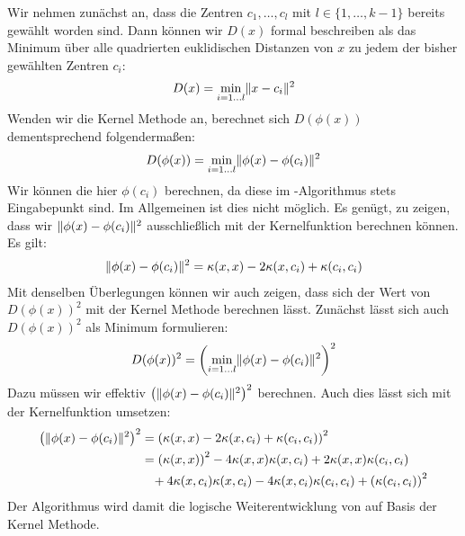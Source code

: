 Wir nehmen zunächst an, dass die Zentren $c_1, \dots, c_l$ mit $l \in \{ 1, \dots, k-1 \}$ bereits gewählt worden sind.
Dann können wir $D(x)$ formal beschreiben als das Minimum über alle quadrierten euklidischen Distanzen von $x$ zu jedem der bisher
gewählten Zentren $c_i$:
\[ D(x) = \min_{i = 1 \dots l} \lVert {x} - {c_i} \rVert^2 \]
Wenden wir die Kernel Methode an, berechnet sich $D(\phi(x))$ dementsprechend folgendermaßen:
\[ D(\phi(x)) = \min_{i = 1 \dots l} \lVert {\phi(x)} - {\phi(c_i)} \rVert^2 \]
Wir können die hier $\phi(c_i)$ berechnen, da diese im \kkmpp-Algorithmus stets Eingabepunkt sind. Im Allgemeinen ist dies
nicht möglich.
Es genügt, zu zeigen, dass wir $\lVert {\phi(x)} - {\phi(c_i)} \rVert^2$ ausschließlich mit der Kernelfunktion berechnen
können.
Es gilt:
\begin{align}
	\lVert {\phi(x)} - {\phi(c_i)} \rVert^2 = \kappa(x,x) - 2 \kappa(x,c_i) + \kappa(c_i,c_i)
\end{align}
Mit denselben Überlegungen können wir auch zeigen, dass sich der Wert von $D(\phi(x))^2$ mit der Kernel Methode berechnen lässt.
Zunächst lässt sich auch $D(\phi(x))^2$ als Minimum formulieren:
\[ D(\phi(x))^2 = \left( \min_{i = 1 \dots l} \lVert {\phi(x)} - {\phi(c_i)} \rVert^2 \right)^2 \]
Dazu müssen wir effektiv $\left( \lVert {\phi(x)} - {\phi(c_i)} \rVert^2 \right)^2$ berechnen. Auch dies lässt sich mit der
Kernelfunktion umsetzen:
\begin{align}
\label{formula:kkmpp}
	\left( \lVert {\phi(x)} - {\phi(c_i)} \rVert^2 \right)^2 &= \left( \kappa(x,x) - 2 \kappa(x,c_i) + \kappa(c_i,c_i) \right)^2 \nonumber \\
	&= \left(\kappa(x,x)\right)^2 - 4 \kappa(x,x) \kappa(x,c_i) + 2 \kappa(x,x) \kappa(c_i,c_i) \nonumber \\
	& \; \; \; + 4 \kappa(x,c_i) \kappa(x,c_i) - 4 \kappa(x,c_i) \kappa(c_i,c_i) + \left(\kappa(c_i,c_i)\right)^2
\end{align}
Der Algorithmus \kkmpp{} wird damit die logische Weiterentwicklung von \kmpp{} auf Basis der Kernel Methode.

